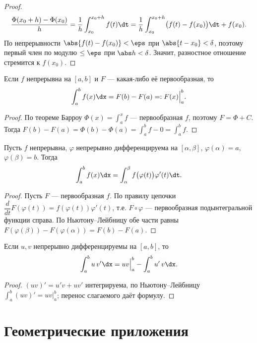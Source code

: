 \begin{proof}
\[
  \frac{\Phi(x_0+h)-\Phi(x_0)}{h}=\frac1h\int_{x_0}^{x_0+h}f(t)\dt
   =\frac1h\int_{x_0}^{x_0+h}\bigl(f(t)-f(x_0)\bigr)\dt+f(x_0).
\]
По непрерывности $\abs{f(t)-f(x_0)}<\eps$ при $\abs{t-x_0}<\delta$, поэтому первый член по модулю
$\le\eps$ при $\abs h<\delta$. Значит, разностное отношение стремится к $f(x_0)$.
\end{proof}

\begin{theorem}
Если $f$ непрерывна на $[a,b]$ и $F$ — какая-либо её первообразная, то
\[
  \int_a^b f(x)\dx=F(b)-F(a)=:F(x)\Big|_a^b .
\]
\end{theorem}

\begin{proof}
По теореме Барроу $\Phi(x)=\int_a^x f$ — первообразная $f$, поэтому $F=\Phi+C$. Тогда
$F(b)-F(a)=\Phi(b)-\Phi(a)=\int_a^b f-0=\int_a^b f$.
\end{proof}

\begin{theorem}
Пусть $f$ непрерывна, $\varphi$ непрерывно дифференцируема на $[\alpha,\beta]$,
$\varphi(\alpha)=a$, $\varphi(\beta)=b$. Тогда
\[
  \int_a^b f(x)\dx=\int_\alpha^\beta f\bigl(\varphi(t)\bigr)\varphi'(t)\dt .
\]
\end{theorem}

\begin{proof}
Пусть $F$ — первообразная $f$. По правилу цепочки $\dfrac{d}{dt}F(\varphi(t))
=f(\varphi(t))\varphi'(t)$, т.е. $F\circ\varphi$ — первообразная подынтегральной функции справа.
По Ньютону–Лейбницу обе части равны $F(\varphi(\beta))-F(\varphi(\alpha))=F(b)-F(a)$.
\end{proof}

\begin{theorem}
Если $u,v$ непрерывно дифференцируемы на $[a,b]$, то
\[
  \int_a^b u\,v'\dx=u v\Big|_a^b-\int_a^b u'\,v\dx .
\]
\end{theorem}

\begin{proof}
$(uv)'=u'v+uv'$ интегрируема, по Ньютону–Лейбницу $\int_a^b(uv)'=uv\big|_a^b$; перенос слагаемого
даёт формулу.
\end{proof}

\section{Геометрические приложения}

